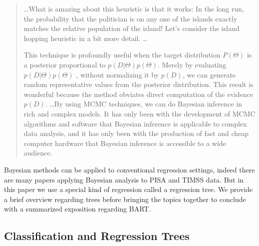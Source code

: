 \documentclass[alpha-refs,fleqn]{wiley-article_p2}
\begin{document}
\begin{quote}
\vspace{1em}

\ldots What is amazing about this heuristic is that it works: In the long run, the probability that the politician is on any one of the islands exactly matches the relative population of the island! Let's consider the island hopping heuristic in a bit more detail. \ldots

\vspace{1em}

This technique is profoundly useful when the target distribution $P(\Theta)$ is a posterior proportional to $p(D|\Theta)p(\Theta)$. Merely by evaluating $p(D|\Theta)p(\Theta)$ , without normalizing it by $p(D)$, we can generate random representative values from the posterior distribution. This result is wonderful because the method obviates direct computation of the evidence $p(D)$. \ldots By using MCMC techniques, we can do Bayesian inference in rich and complex models. It has only been with the development of MCMC algorithms and software that Bayesian inference is applicable to complex data analysis, and it has only been with the production of fast and cheap computer hardware that Bayesian inference is accessible to a wide audience.

\end{quote}


Bayesian methods can be applied to conventional regression settings, indeed there are many papers applying Bayesian analysis to PISA and TIMSS data. But in this paper we use a special kind of regression called a regression tree. We provide a brief overview regarding trees before bringing the topics together to conclude with a summarized exposition regarding BART. 

\subsection{Classification and Regression Trees} 
\end{document}
